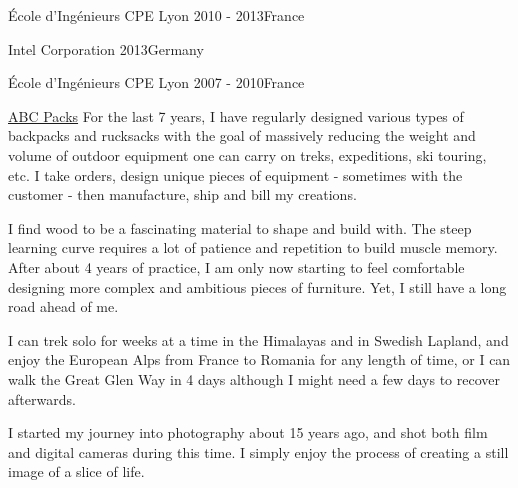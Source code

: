 \documentclass[10pt,a4paper]{moderncv}
\begin{document}
\clearpage
    

    {École d'Ingénieurs CPE Lyon}
    {2010 - 2013}{France}

    {Intel Corporation}
    {2013}{Germany}

    {École d'Ingénieurs CPE Lyon}
    {2007 - 2010}{France}



  {\href{https://abcpacks.com}{ABC Packs}}
  {For the last 7 years, I have regularly designed various types of backpacks and rucksacks with the goal of massively reducing the weight and volume of outdoor equipment one can carry on treks, expeditions, ski touring, etc. I take orders, design unique pieces of equipment - sometimes with the customer - then manufacture, ship and bill my creations.}
  
  {}
  {
    I find wood to be a fascinating material to shape and build with. The steep learning curve requires a lot of patience and repetition to build muscle memory. After about 4 years of practice, I am only now starting to feel comfortable designing more complex and ambitious pieces of furniture. Yet, I still have a long road ahead of me.
  }

  {}
  {
    I can trek solo for weeks at a time in the Himalayas and in Swedish Lapland, and enjoy the European Alps from France to Romania for any length of time, or I can walk the Great Glen Way in 4 days although I might need a few days to recover afterwards.
  }

  {}
  {
    I started my journey into photography about 15 years ago, and shot both film and digital cameras during this time. I simply enjoy the process of creating a still image of a slice of life.
  }

\clearpage


\end{document}
